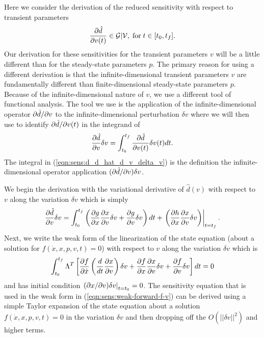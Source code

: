 \documentclass[pdf,ps2pdf,11pt]{SANDreport}
\begin{document}
Here we consider the derivation of the reduced sensitivity with respect to
transient parameters
%
\begin{equation}
\displaystyle{\frac{\partial \hat{d}}{\partial v(t)}} \in \mathcal{G}|\mathcal{V}, \; \mbox{for} \; t\in[t_0,t_f].
\end{equation}
%
Our derivation for these sensitivities for the transient parameters $v$ will
be a little different than for the steady-state parameters $p$.  The primary
reason for using a different derivation is that the infinite-dimensional
transient parameters $v$ are fundamentally different than finite-dimensional
steady-state parameters $p$.  Because of the infinite-dimensional nature of
$v$, we use a different tool of functional analysis.  The tool we use is the
application of the infinite-dimensional operator $\partial \hat{d} / \partial v$ to the
infinite-dimensional perturbation $\delta v$ where we will then use to
identify $\partial \hat{d} / \partial v(t)$ in the integrand of
%
\begin{equation}
\displaystyle{\frac{\partial \hat{d}}{\partial v}} \delta v = \int_{t_0}^{t_f} \displaystyle{\frac{\partial \hat{d}}{\partial v(t)}} \delta v(t) dt.
\label{eqn:sens:d_d_hat_d_v_delta_v}
\end{equation}
%
The integral in (\ref{eqn:sens:d_d_hat_d_v_delta_v}) is the definition the
infinite-dimensional operator application $(\partial \hat{d} / \partial v) {}\delta v$.

We begin the derivation with the variational derivative of $\hat{d}(v)$ with
respect to $v$ along the variation $\delta v$ which is simply
%
\begin{equation}
\displaystyle{\frac{\partial \hat{d}}{\partial v}} \delta v
= \int_{t_0}^{t_f} \left( \displaystyle{\frac{\partial g}{\partial x}} \displaystyle{\frac{\partial x}{\partial v}} \delta v +  \displaystyle{\frac{\partial g}{\partial v}} \delta v \right) dt
+ \left. \left(  \displaystyle{\frac{\partial h}{\partial x}} \displaystyle{\frac{\partial x}{\partial v}} \delta v \right) \right|_{t=t_f}.
\label{eqn:sens:d_d_hat_d_v_delta_v-2}
\end{equation}
%
Next, we write the weak form of the linearization of the state equation (about
a solution for $f(\dot{x},x,p,v,t)=0$) with respect to $v$ along the variation
$\delta v$ which is
%
\begin{equation}
%
\int_{t_0}^{t_f} \Lambda^T \left[
\Jac{f}{\dot{x}} \left(\frac{d}{dt} \Jac{x}{v} \right) \delta v + \Jac{f}{x} \Jac{x}{v} \delta v
+ \Jac{f}{v} \delta v \right] dt = 0
\label{eqn:sens:weak-forward-f-v}
\end{equation}
%
and has initial condition $\left.(\partial x / \partial v)\delta v\right|_{t=t_0} = 0$.
The sensitivity equation that is used in the weak form in
(\ref{eqn:sens:weak-forward-f-v}) can be derived using a simple
Taylor expansion of the state equation about a solution $f(\dot{x},x,p,v,t)=0$
in the variation $\delta v$ and then dropping off the $O(||\delta v||^2)$ and
higher terms.
\end{document}
